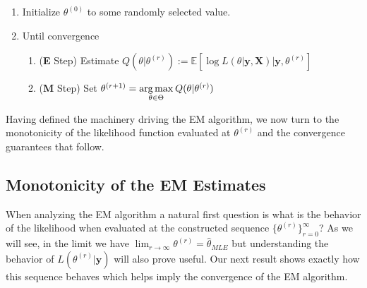 \documentclass{article}
\newcommand{\E}{{\mathbb{E}}}
\begin{document}
\begin{enumerate}
\item Initialize $\theta^{(0)}$ to some randomly selected value. 
\item Until convergence
	\begin{enumerate}
	\item (\textbf{E} Step) Estimate $Q(\theta|\theta^{(r)}):= \E\left[\log L(\theta|\mathbf{y},\mathbf{X})\big|\mathbf{y},\theta^{(r)}\right]$
	\item (\textbf{M} Step) Set $\theta^{(r+1)} = \underset{\theta\in\Theta}{\arg\max} \hspace{.2em}Q(\theta|\theta^{(r)})$
	\end{enumerate}
\end{enumerate}
Having defined the machinery driving the EM algorithm, we now turn to the monotonicity of the likelihood function evaluated at $\theta^{(r)}$ and the convergence guarantees that follow. 

\subsection{Monotonicity of the EM Estimates}

When analyzing the EM algorithm a natural first question is what is the behavior of the likelihood when evaluated at the constructed sequence $\{\theta^{(r)}\}_{r=0}^{\infty}$? As we will see, in the limit we have $\lim_{r\to\infty}\theta^{(r)} = \hat{\theta}_{MLE}$ but understanding the behavior of $L(\theta^{(r)}|\mathbf{y})$ will also prove useful. Our next result shows exactly how this sequence behaves which helps imply the convergence of the EM algorithm.
\end{document}
